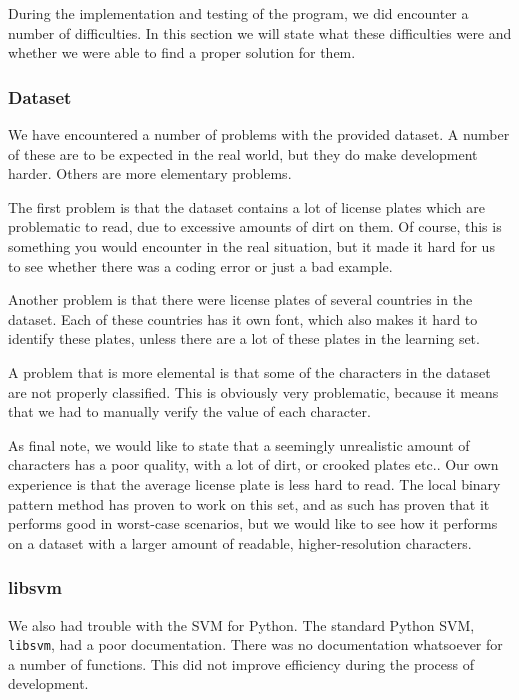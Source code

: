 \documentclass[a4paper]{article}
\begin{document}
During the implementation and testing of the program, we did encounter a
number of difficulties. In this section we will state what these difficulties
were and whether we were able to find a proper solution for them.

\subsubsection*{Dataset}

We have encountered a number of problems with the provided dataset. A number of
these are to be expected in the real world, but they do make development
harder. Others are more elementary problems.

The first problem is that the dataset contains a lot of license plates which
are problematic to read, due to excessive amounts of dirt on them. Of course,
this is something you would encounter in the real situation, but it made it
hard for us to see whether there was a coding error or just a bad example.

Another problem is that there were license plates of several countries in
the dataset. Each of these countries has it own font, which also makes it
hard to identify these plates, unless there are a lot of these plates in the
learning set.

A problem that is more elemental is that some of the characters in the dataset
are not properly classified. This is obviously very problematic, because it
means that we had to manually verify the value of each character.

As final note, we would like to state that a seemingly unrealistic amount
of characters has a poor quality, with a lot of dirt, or crooked plates
etc.. Our own experience is that the average license plate is less hard to
read. The local binary pattern method has proven to work on this set, and as
such has proven that it performs good in worst-case scenarios, but we would
like to see how it performs on a dataset with a larger amount of readable,
higher-resolution characters.

\subsubsection*{libsvm}

We also had trouble with the SVM for Python. The standard Python SVM,
\texttt{libsvm}, had a poor documentation. There was no documentation
whatsoever for a number of functions. This did not improve efficiency during
the process of development.
\end{document}
